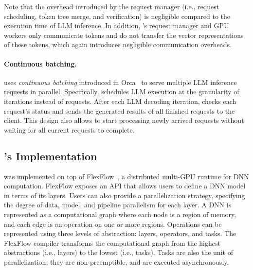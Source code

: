 Note that the overhead introduced by the request manager (i.e., request scheduling, token tree merge, and verification) is negligible compared to the execution time of LLM inference. In addition, \sys's request manager and GPU workers only communicate tokens and do not transfer the vector representations of these tokens, which again introduces negligible communication overheads.


\paragraph{Continuous batching.}
\Sys uses {\em continuous batching} introduced in Orca~\cite{yu2022orca} to serve multiple LLM inference requests in parallel. Specifically, \sys schedules LLM execution at the granularity of iterations instead of requests. After each LLM decoding iteration, \sys checks each request's status and sends the generated results of all finished requests to the client. This design also allows \sys to start processing newly arrived requests without waiting for all current requests to complete.

\subsection{\Sys's Implementation}
\label{subsec:implementation}
\Sys was implemented on top of FlexFlow~\cite{jia2019flexflow, unger2022unity}, a distributed multi-GPU runtime for DNN computation. FlexFlow exposes an API that allows users to define a DNN model in terms of its layers.
Users can also provide a parallelization strategy, specifying the degree of data, model, and pipeline parallelism for each layer. 
%
A DNN is represented as a computational graph where each node is a region of memory, and each edge is an operation on one or more regions. Operations can be represented using three levels of abstraction: layers, operators, and tasks. The FlexFlow compiler transforms the computational graph from the highest abstractions (i.e., layers) to the lowest (i.e., tasks). Tasks are also the unit of parallelization; they are non-preemptible, and are executed asynchronously. 

